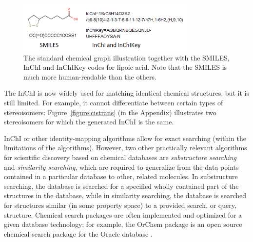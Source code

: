 \documentclass{sig-alternate}
\begin{document}
\begin{figure}
\centering
\includegraphics[height=1in]{lipoicacid.png}
\caption{The standard chemical graph illustration together with the SMILES, InChI and InChIKey codes for lipoic acid. Note that the SMILES is much more human-readable than the others.}
\label{figure:smiles}
\end{figure}

The InChI is now widely used for matching identical chemical structures, but it
is still limited. For example, it cannot differentiate between
certain types of stereoisomers: Figure~\ref{figure:cistrans} (in the Appendix) illustrates two stereoisomers for which
the generated InChI is the same.

InChI or other identity-mapping algorithms allow for exact searching (within the
limitations of the algorithms). However, two other practically relevant algorithms for scientific
discovery based on chemical databases are \emph{substructure searching} and \emph{similarity
searching}, which are required to generalize from the data points contained in a particular database to other, related
molecules. In substructure searching, the database is searched for a specified
wholly contained part of the structures in the database, while in similarity
searching, the database is searched for structures similar (in some property space) to a provided search, or query,
structure. Chemical search packages are often implemented and optimized for a
given database technology; for example, the OrChem package is an open source
chemical search package for the Oracle database \cite{rijnbeek2009}.
\end{document}
